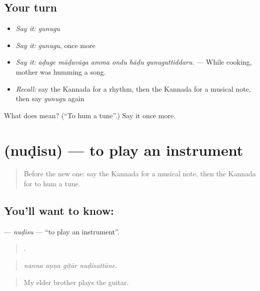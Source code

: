 \subsection*{Your turn}
\begin{itemize}
\raggedright
  \item \emph{Say it:} \emph{gunugu}
  \item \emph{Say it:} \emph{gunugu}, once more
  \item \emph{Say it:} \emph{aḍuge māḍuvāga amma ondu hāḍu gunuguttiddaru.} — While cooking, mother was humming a song.
  \item \emph{Recall:} say the Kannada for a rhythm, then the Kannada for a musical note, then say \emph{gunugu} again
\end{itemize}

\begin{tcolorbox}[breakable,colback=teal!4,colframe=teal!35!black,title={Before you move on}]
What does  mean? (\textquotedblleft{}To hum a tune\textquotedblright{}.) Say it once more.
\end{tcolorbox}
\section[\texorpdfstring{\kn{ನುಡಿಸು} (nuḍisu)}{ನುಡಿಸು (nuḍisu)}]{ (nuḍisu) — to play an instrument}

\label{lesson:KA-C534-nudisu}



\begin{quote}
Before the new one: say the Kannada for a musical note, then the Kannada for to hum a tune.
\end{quote}

\subsection*{You'll want to know: }
\textbf{} — \emph{nuḍisu} — \textquotedblleft{}to play an instrument\textquotedblright{}.

\begin{quote}
   .
\end{quote}

\begin{quote}
\emph{nanna aṇṇa giṭār nuḍisuttāne.}
\end{quote}

\begin{quote}
My elder brother plays the guitar.
\end{quote}

